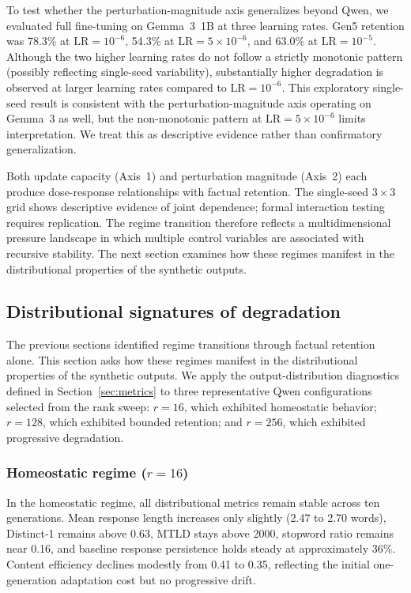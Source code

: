 \documentclass[a4paper,fleqn]{cas-dc}
\newif\ifshowchanges
\newcommand{\rev}[1]{\ifshowchanges{\color{blue}#1}\else{#1}\fi}
\begin{document}
To test whether the perturbation-magnitude axis generalizes beyond Qwen, we
evaluated full fine-tuning on Gemma~3~1B at three learning rates. Gen5 retention
was 78.3\% at $\mathrm{LR}=10^{-6}$, 54.3\% at $\mathrm{LR}=5 \times 10^{-6}$,
and 63.0\% at $\mathrm{LR}=10^{-5}$. Although the two higher learning rates do
not follow a strictly monotonic pattern (possibly reflecting single-seed
variability), substantially higher degradation is observed at larger learning
rates compared to $\mathrm{LR}=10^{-6}$. \rev{This exploratory single-seed result is consistent with the perturbation-magnitude
axis operating on Gemma~3 as well, but the non-monotonic pattern at $\mathrm{LR}=5\times10^{-6}$
limits interpretation. We treat this as descriptive evidence rather than
confirmatory generalization.}

Both update capacity (Axis~1) and perturbation magnitude (Axis~2) each produce
dose-response relationships with factual retention. \rev{The single-seed $3{\times}3$ grid shows descriptive evidence of joint dependence; formal interaction testing requires replication.} The regime transition therefore reflects a
multidimensional pressure landscape in which multiple control variables are
associated with recursive stability. The next section examines how these regimes
manifest in the distributional properties of the synthetic outputs.

\subsection{Distributional signatures of degradation}\label{sec:res_distribution}

The previous sections identified regime transitions through factual retention
alone. This section asks how these regimes manifest in the distributional
properties of the synthetic outputs. We apply the output-distribution diagnostics
defined in Section~\ref{sec:metrics} to three representative Qwen configurations
selected from the rank sweep: $r=16$, which exhibited homeostatic behavior;
$r=128$, which exhibited bounded retention; and $r=256$, which exhibited
progressive degradation.

\subsubsection{Homeostatic regime ($r=16$)}
In the homeostatic regime, all distributional metrics remain stable across ten
generations. Mean response length increases only slightly (2.47 to 2.70 words),
Distinct-1 remains above 0.63, MTLD stays above 2000, stopword ratio remains
near 0.16, and baseline response persistence holds steady at approximately 36\%.
Content efficiency declines modestly from 0.41 to 0.35, reflecting the initial
one-generation adaptation cost but no progressive drift.
\end{document}
